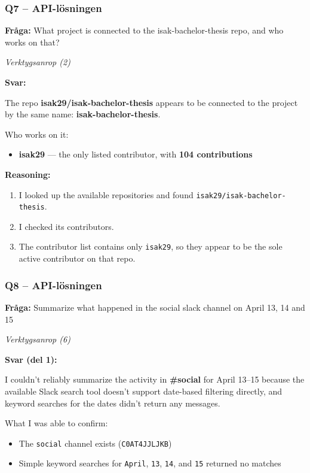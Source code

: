 \clearpage
\subsubsection*{Q7 -- API-lösningen}\label{fig:api_q7}

\textbf{Fråga:} What project is connected to the isak-bachelor-thesis repo, and who works on that?

\medskip
\textit{Verktygsanrop (2)}

\medskip
\textbf{Svar:}

The repo \textbf{isak29/isak-bachelor-thesis} appears to be connected to the project by the same name: \textbf{isak-bachelor-thesis}.

Who works on it:
\begin{itemize}
    \item \textbf{isak29} --- the only listed contributor, with \textbf{104 contributions}
\end{itemize}

\textbf{Reasoning:}
\begin{enumerate}
    \item I looked up the available repositories and found \texttt{isak29/isak-bachelor-thesis}.
    \item I checked its contributors.
    \item The contributor list contains only \texttt{isak29}, so they appear to be the sole active contributor on that repo.
\end{enumerate}

\clearpage
\subsubsection*{Q8 -- API-lösningen}\label{fig:api_q8_1}\label{fig:api_q8_2}

\textbf{Fråga:} Summarize what happened in the social slack channel on April 13, 14 and 15

\medskip
\textit{Verktygsanrop (6)}

\medskip
\textbf{Svar (del 1):}

I couldn't reliably summarize the activity in \textbf{\#social} for April 13--15 because the available Slack search tool doesn't support date-based filtering directly, and keyword searches for the dates didn't return any messages.

What I was able to confirm:
\begin{itemize}
    \item The \texttt{social} channel exists (\texttt{C0AT4JJLJKB})
    \item Simple keyword searches for \texttt{April}, \texttt{13}, \texttt{14}, and \texttt{15} returned no matches
\end{itemize}

